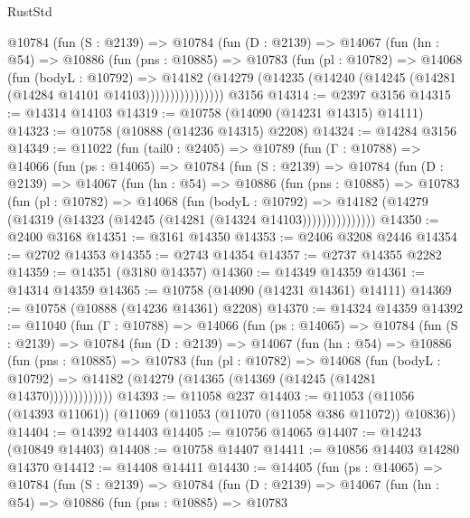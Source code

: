 \begin{lexlean}{RustStd}
\begin{coremodule}
          @10784
            (fun (S : @2139) =>
            @10784
              (fun (D : @2139) =>
              @14067
                (fun (hn : @54) =>
                @10886
                  (fun (pns : @10885) =>
                  @10783
                    (fun (pl : @10782) =>
                    @14068
                      (fun (bodyL : @10792) =>
                      @14182
                        (@14279
                          (@14235 (@14240 (@14245 (@14281 (@14284 @14101 @14103))))))))))))))))
    @3156
@14314 := @2397 @3156
@14315 := @14314 @14103
@14319 := @10758 (@14090 (@14231 @14315) @14111)
@14323 := @10758 (@10888 (@14236 @14315) @2208)
@14324 := @14284 @3156
@14349 := @11022
    (fun (tail0 : @2405) =>
    @10789
      (fun (Γ : @10788) =>
      @14066
        (fun (ps : @14065) =>
        @10784
          (fun (S : @2139) =>
          @10784
            (fun (D : @2139) =>
            @14067
              (fun (hn : @54) =>
              @10886
                (fun (pns : @10885) =>
                @10783
                  (fun (pl : @10782) =>
                  @14068
                    (fun (bodyL : @10792) =>
                    @14182 (@14279 (@14319 (@14323 (@14245 (@14281 (@14324 @14103)))))))))))))))
@14350 := @2400 @3168
@14351 := @3161 @14350
@14353 := @2406 @3208 @2446
@14354 := @2702 @14353
@14355 := @2743 @14354
@14357 := @2737 @14355 @2282
@14359 := @14351 (@3180 @14357)
@14360 := @14349 @14359
@14361 := @14314 @14359
@14365 := @10758 (@14090 (@14231 @14361) @14111)
@14369 := @10758 (@10888 (@14236 @14361) @2208)
@14370 := @14324 @14359
@14392 := @11040
    (fun (Γ : @10788) =>
    @14066
      (fun (ps : @14065) =>
      @10784
        (fun (S : @2139) =>
        @10784
          (fun (D : @2139) =>
          @14067
            (fun (hn : @54) =>
            @10886
              (fun (pns : @10885) =>
              @10783
                (fun (pl : @10782) =>
                @14068
                  (fun (bodyL : @10792) =>
                  @14182 (@14279 (@14365 (@14369 (@14245 (@14281 @14370)))))))))))))
@14393 := @11058 @237
@14403 := @11053 (@11056 (@14393 @11061)) (@11069 (@11053 (@11070 (@11058 @386 @11072)) @10836))
@14404 := @14392 @14403
@14405 := @10756 @14065
@14407 := @14243 (@10849 @14403)
@14408 := @10758 @14407
@14411 := @10856 @14403 @14280 @14370
@14412 := @14408 @14411
@14430 := @14405
    (fun (ps : @14065) =>
    @10784
      (fun (S : @2139) =>
      @10784
        (fun (D : @2139) =>
        @14067
          (fun (hn : @54) =>
          @10886
            (fun (pns : @10885) =>
            @10783

\end{coremodule}
\end{lexlean}
